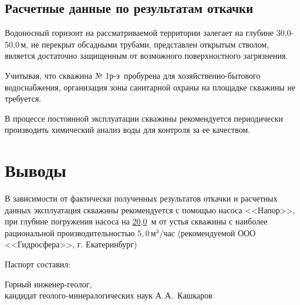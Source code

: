 \documentclass[a4paper,12pt]{article} %
\newcommand{\txtExecutor}{ООО <<Гидросфера>>}		%
\newcommand{\txtNumber}{№ 1р-э}  					%
\newcommand{\txtPump}{<<Напор>>}  					%
\newcommand{\txtDepth}{50,0}						%
\newcommand{\txtDebit}{5,0}							%
\newcommand{\txtHorizDepth}{30,0}					%
\newcommand{\txtPumpDepth}{20,0}						%
\begin{document}
\subsection*{Расчетные данные по результатам откачки}

Водоносный горизонт на рассматриваемой территории залегает на глубине 	\txtHorizDepth - \txtDepth	\,м, не перекрыт обсадными трубами, представлен открытым стволом, является достаточно защищенным от возможного поверхностного загрязнения.

Учитывая, что скважина \txtNumber \, пробурена для хозяйственно-бытового водоснабжения, организация зоны санитарной охраны на площадке скважины не требуется.

В процессе постоянной эксплуатации скважины рекомендуется периодически производить химический анализ воды для контроля за ее качеством.

\section*{Выводы}

В зависимости от фактически полученных результатов откачки и расчетных данных эксплуатация скважины рекомендуется с помощью насоса  \txtPump, при глубине погружения насоса  на \underline{\txtPumpDepth} \,м от устья скважины с наиболее рациональной производительностью 	$\txtDebit \,м^3/час$ (рекомендуемой \txtExecutor, г. Екатеринбург)

\bigskip

Паспорт составил:

\bigskip

\begin{minipage}{1.0\textwidth}
	Горный инженер-геолог,\\
	кандидат геолого-минералогических наук 
	А.\,А.~Кашкаров
\end{minipage}
\end{document}
